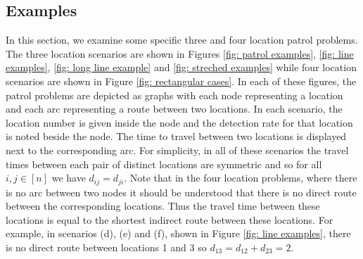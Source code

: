 \documentclass[11pt,a4paper]{article}
\begin{document}
\subsection{Examples} \label{sec: examples}
In this section, we examine some specific three and four location patrol problems.
The three location scenarios are shown in Figures \ref{fig: patrol examples}, \ref{fig: line examples}, \ref{fig: long line example} and \ref{fig: streched examples} while four location scenarios are shown in Figure \ref{fig: rectangular cases}.
In each of these figures, the patrol problems are depicted as graphs with each node representing a location and each arc representing a route between two locations.
In each scenario, the location number is given inside the node and the detection rate for that location is noted beside the node.
The time to travel between two locations is displayed next to the corresponding arc.
For simplicity, in all of these scenarios the travel times between each pair of distinct locations are symmetric and so for all $i, j \in [n]$ we have $d_{ij}=d_{ji}$.
Note that in the four location problems, where there is no arc between two nodes it should be understood that there is no direct route between the corresponding locations.
Thus the travel time between these locations is equal to the shortest indirect route between these locations.
For example, in scenarios (d), (e) and (f), shown in Figure \ref{fig: line examples}, there is no direct route between locations 1 and 3 so $d_{13} = d_{12} + d_{23} = 2$.  
\end{document}
